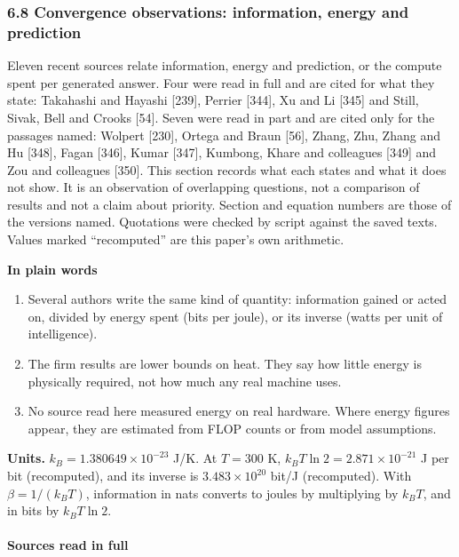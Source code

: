 \documentclass[
  10pt,
]{article}
\providecommand{\tightlist}{%
  \setlength{\itemsep}{0pt}\setlength{\parskip}{0pt}}
\begin{document}
\subsubsection{6.8 Convergence observations: information, energy and
prediction}\label{convergence-observations-information-energy-and-prediction}

Eleven recent sources relate information, energy and prediction, or the
compute spent per generated answer. Four were read in full and are cited
for what they state: Takahashi and Hayashi {[}239{]}, Perrier {[}344{]},
Xu and Li {[}345{]} and Still, Sivak, Bell and Crooks {[}54{]}. Seven
were read in part and are cited only for the passages named: Wolpert
{[}230{]}, Ortega and Braun {[}56{]}, Zhang, Zhu, Zhang and Hu
{[}348{]}, Fagan {[}346{]}, Kumar {[}347{]}, Kumbong, Khare and
colleagues {[}349{]} and Zou and colleagues {[}350{]}. This section
records what each states and what it does not show. It is an observation
of overlapping questions, not a comparison of results and not a claim
about priority. Section and equation numbers are those of the versions
named. Quotations were checked by script against the saved texts. Values
marked ``recomputed'' are this paper's own arithmetic.

\textbf{In plain words}

\begin{enumerate}
\def\labelenumi{\arabic{enumi}.}
\tightlist
\item
  Several authors write the same kind of quantity: information gained or
  acted on, divided by energy spent (bits per joule), or its inverse
  (watts per unit of intelligence).
\item
  The firm results are lower bounds on heat. They say how little energy
  is physically required, not how much any real machine uses.
\item
  No source read here measured energy on real hardware. Where energy
  figures appear, they are estimated from FLOP counts or from model
  assumptions.
\end{enumerate}

\textbf{Units.} \(k_B = 1.380649\times10^{-23}\) J/K. At \(T = 300\) K,
\(k_B T\ln 2 = 2.871\times10^{-21}\) J per bit (recomputed), and its
inverse is \(3.483\times10^{20}\) bit/J (recomputed). With
\(\beta = 1/(k_B T)\), information in nats converts to joules by
multiplying by \(k_B T\), and in bits by \(k_B T\ln 2\).

\paragraph{Sources read in full}\label{sources-read-in-full}
\end{document}
